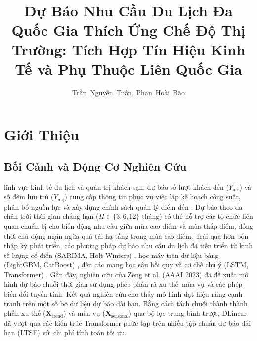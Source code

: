 \documentclass[10pt,journal,compsoc]{IEEEtran}
\title{Dự Báo Nhu Cầu Du Lịch Đa Quốc Gia Thích Ứng Chế Độ Thị Trường: Tích Hợp Tín Hiệu Kinh Tế và Phụ Thuộc Liên Quốc Gia}
\author{Trần~Nguyễn~Tuấn,
        Phan~Hoài~Bão}
\renewcommand{\thesection}{\Roman{section}}%
\renewcommand{\thesubsection}{\Alph{subsection}}%
\renewcommand{\thesubsubsection}{\arabic{subsubsection}}%
\renewcommand{\thesectiondis}{\Roman{section}.}%
\renewcommand{\thesubsectiondis}{\Alph{subsection}.}%
\renewcommand{\thesubsubsectiondis}{\arabic{subsubsection})}%
\begin{document}
\renewcommand{\thesection}{\Roman{section}}
\renewcommand{\thesubsection}{\Alph{subsection}}
\renewcommand{\thesubsubsection}{\arabic{subsubsection}}
\renewcommand{\thesectiondis}{\Roman{section}.}
\renewcommand{\thesubsectiondis}{\Alph{subsection}.}
\renewcommand{\thesubsubsectiondis}{\arabic{subsubsection})}
\maketitle
\IEEEdisplaynontitleabstractindextext
\IEEEpeerreviewmaketitle
\raggedbottom
\section{Giới Thiệu}
\subsection{Bối Cảnh và Động Cơ Nghiên Cứu}
 lĩnh vực kinh tế du lịch và quản trị khách sạn, dự báo số lượt khách đến ($Y_{\text{arr}}$) và số đêm lưu trú ($Y_{\text{nig}}$) cung cấp thông tin phục vụ việc lập kế hoạch công suất, phân bổ nguồn lực và xây dựng chính sách quản lý điểm đến \cite{song2019tourism}. Dự báo theo đa chân trời thời gian chẳng hạn ($H \in \{3, 6, 12\}$ tháng) có thể hỗ trợ các tổ chức liên quan chuẩn bị cho biến động nhu cầu giữa mùa cao điểm và mùa thấp điểm, đồng thời chủ động ngăn ngừa quá tải hạ tầng trong mùa cao điểm.
Trải qua hơn bốn thập kỷ phát triển, các phương pháp dự báo nhu cầu du lịch đã tiến triển từ kinh tế lượng cổ điển (SARIMA, Holt-Winters) \cite{athanasopoulos2011tourism}, học máy trên dữ liệu bảng (LightGBM, CatBoost) \cite{dorogush2018catboost}, đến các mạng học sâu hồi quy và cơ chế chú ý (LSTM, Transformer) \cite{claveria2016tourism, law2019tourism}. Gần đây, nghiên cứu của Zeng et al. (AAAI 2023) \cite{zeng2023dlinear} đã đề xuất mô hình dự báo chuỗi thời gian sử dụng phép phân rã xu thế--mùa vụ và các phép biến đổi tuyến tính. Kết quả nghiên cứu cho thấy mô hình đạt hiệu năng cạnh tranh trên một số bộ dữ liệu dự báo dài hạn. Bằng cách tách chuỗi thành thành phần xu thế ($\mathbf{X}_{\text{trend}}$) và mùa vụ ($\mathbf{X}_{\text{seasonal}}$) qua bộ lọc trung bình trượt, DLinear đã vượt qua các kiến trúc Transformer phức tạp trên nhiều tập chuẩn dự báo dài hạn (LTSF) với chi phí tính toán tối ưu.
\end{document}
